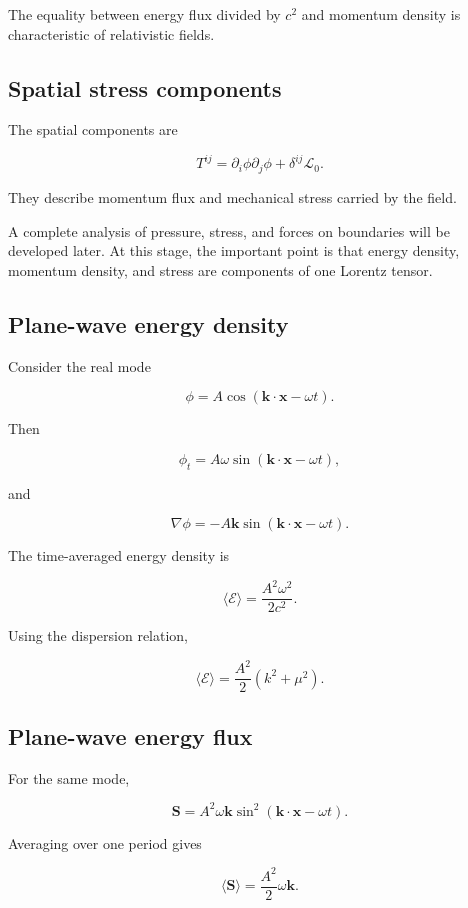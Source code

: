 The equality between energy flux divided by \(c^{2}\) and momentum density is characteristic of relativistic fields.

\subsection{Spatial stress components}

The spatial components are

\[
T^{ij}
=
\partial_{i}\phi\partial_{j}\phi
+
\delta^{ij}\mathcal{L}_{0}.
\]

They describe momentum flux and mechanical stress carried by the field.

A complete analysis of pressure, stress, and forces on boundaries will be developed later. At this stage, the important point is that energy density, momentum density, and stress are components of one Lorentz tensor.

\subsection{Plane-wave energy density}

Consider the real mode

\[
\phi
=
A\cos(
\mathbf{k}\cdot\mathbf{x}-\omega t
).
\]

Then

\[
\phi_{t}
=
A\omega\sin(
\mathbf{k}\cdot\mathbf{x}-\omega t
),
\]

and

\[
\nabla\phi
=
-A\mathbf{k}
\sin(
\mathbf{k}\cdot\mathbf{x}-\omega t
).
\]

The time-averaged energy density is

\[
\langle\mathcal{E}\rangle
=
\frac{A^{2}\omega^{2}}{2c^{2}}.
\]

Using the dispersion relation,

\[
\boxed{
\langle\mathcal{E}\rangle
=
\frac{A^{2}}{2}
(k^{2}+\mu^{2})
}.
\]

\subsection{Plane-wave energy flux}

For the same mode,

\[
\mathbf{S}
=
A^{2}\omega\mathbf{k}
\sin^{2}(
\mathbf{k}\cdot\mathbf{x}-\omega t
).
\]

Averaging over one period gives

\[
\boxed{
\langle\mathbf{S}\rangle
=
\frac{A^{2}}{2}
\omega\mathbf{k}
}.
\]

